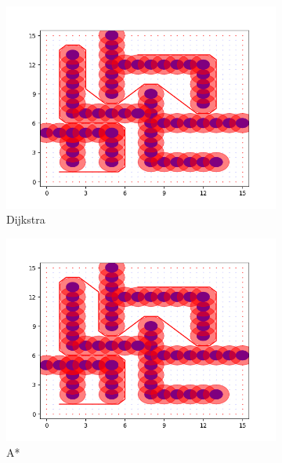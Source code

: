 \documentclass{article}
\begin{document}
\begin{figure}[H]
    \begin {subfigure} [b] {0.5\textwidth}
        \centering
        \includegraphics[width=\textwidth]{question1_dijkstras_path.png}
        \caption*{Dijkstra}
    \end {subfigure}
    \begin {subfigure} [b] {0.5\textwidth}
        \centering
        \includegraphics[width=\textwidth]{question1_astar_path.png}
        \caption*{A*}
    \end {subfigure}
    \begin {subfigure} [b] {0.5\textwidth}
        \centering

\end{subfigure}
\end{figure}
\end{document}
